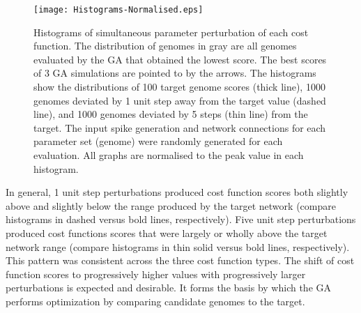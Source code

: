 \begin{figure}[tb!]
  \centering
  \texttt{[image: Histograms-Normalised.eps]}  
  \caption{Histograms of simultaneous parameter perturbation of each cost
    function. The distribution of genomes in gray are all genomes evaluated by
    the GA that obtained the lowest score. The best scores of 3 GA simulations
    are pointed to by the arrows. The histograms show the distributions of 100
    target genome scores (thick line), 1000 genomes deviated by 1 unit step away
    from the target value (dashed line), and 1000 genomes deviated by 5 steps
    (thin line) from the target. The input spike generation and network
    connections for each parameter set (genome) were randomly generated for each
    evaluation.  All graphs are normalised to the peak value in each
    histogram.\label{fig:R3}}
\end{figure}


\medskip{}

In general, 1 unit step perturbations produced cost function scores both
slightly above and slightly below the range produced by the target network
(compare histograms in dashed versus bold lines, respectively). Five unit step
perturbations produced cost functions scores that were largely or wholly above
the target network range (compare histograms in thin solid versus bold lines,
respectively). This pattern was consistent across the three cost function
types. The shift of cost function scores to progressively higher values with
progressively larger perturbations is expected and desirable. It forms the basis
by which the GA performs optimization by comparing candidate genomes to the
target.


\medskip{}


